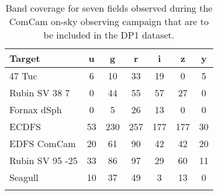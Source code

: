 \begin{table*}
    \centering
    \caption{Band coverage for seven fields observed during the ComCam on-sky observing campaign that are to be included in the DP1 dataset.} 
    \begin{tabular}{@{}lcccccc@{}}
           \noalign{\vspace{5pt}}\hline\hline \noalign{\vspace{5pt}}
    \textbf{Target} & \textbf{u} & \textbf{g} & \textbf{r} & \textbf{i} & \textbf{z} & \textbf{y} \\
        \hline  \noalign{\vspace{3pt}}

    47 Tuc          &        6 &        10 &    33 &    19 &     0 &     5 \\
    Rubin SV 38 7       &       0 &    44 &     55 &    57 &    27 &     0 \\
    Fornax dSph         &       0 &      5 &    26 &    13 &     0 &     0 \\
    ECDFS               &      53 &   230 &   257 &   177 &   177 &     30 \\
    EDFS ComCam         &      20 &     61 &    90 &    42 &    42 &    20 \\
    Rubin SV 95 -25 &       33 &        86 &    97 &    29 &    60 &    11 \\
    Seagull         &      10 & 37 &    49 &    3  &    13 &     0 \\
         \noalign{\vspace{3pt}}\hline
    \end{tabular}
    \label{tab:dp1_fields_visits}
\end{table*}

